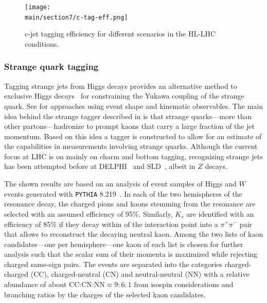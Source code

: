 \documentclass[../report.tex]{subfiles}
\providecommand{\main}{..}
\begin{document}
\begin{figure}[ht]
	\centering
	\texttt{[image: \\main/section7/c-tag-eff.png]}
	\caption{c-jet tagging efficiency for different scenarios in the HL-LHC conditions.}
	\label{fig:c-tag-eff}
\end{figure}

\FloatBarrier

\subsubsection{Strange quark tagging}
\label{sec:strange-tagging}

Tagging strange jets from Higgs decays provides an alternative method to exclusive Higgs
decays~\cite{Kagan:2014ila, Perez:2015lra, Koenig:2015pha, Aaboud:2016rug, Aaboud:2017xnb,
  Alte:2016yuw} for constraining the Yukawa coupling of the strange quark. See  for approaches using event shape and kinematic
observables. The main idea behind the strange tagger described in  is that
strange quarks---more than other partons---hadronize to prompt kaons that carry a large fraction of
the jet momentum. Based on this idea a tagger is constructed to allow for an estimate of the
capabilities in measurements involving strange quarks. Although the current focus at LHC is on
mainly on charm and bottom tagging, recognizing strange jets has been attempted before at
DELPHI~\cite{Boudinov:1998fao} and SLD~\cite{Kalelkar:2000ig}, albeit in $Z$ decays.

The shown results are based on an analysis of event samples of Higgs and $W$ events generated with
\texttt{PYTHIA} 8.219~\cite{Sjostrand:2006za, Sjostrand:2014zea}. In each of the two hemispheres of
the resonance decay, the charged pions and kaons stemming from the resonance are selected with an
assumed efficiency of 95\%. Similarly, $K_s$ are identified with an efficiency of 85\% if they decay
within  of the interaction point into a $\pi^+\pi^-$ pair that allows to reconstruct
the decaying neutral kaon. Among the two lists of kaon candidates---one per hemisphere---one kaon of
each list is chosen for further analysis such that the scalar sum of their momenta is maximized
while rejecting charged same-sign pairs. The events are separated into the categories
charged-charged (CC), charged-neutral (CN) and neutral-neutral (NN) with a relative abundance of
about CC:CN:NN$\approx 9:6:1$ from isospin considerations and branching ratios by the charges of the
selected kaon candidates.
\end{document}
